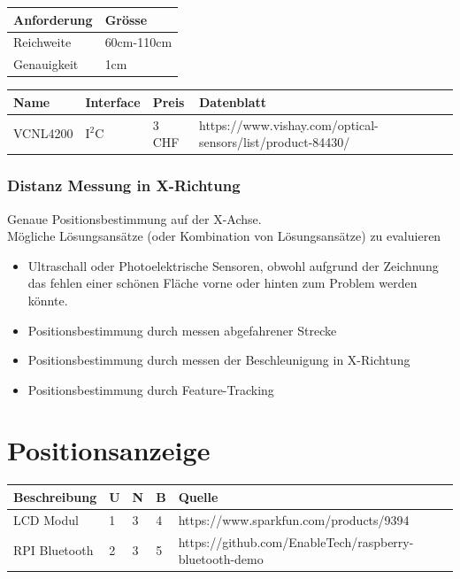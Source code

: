 \documentclass[a4paper]{report}
\begin{document}
\vspace{1em}
\noindent
\begin{tabular}{|p{}|p{}|}
  \hline
  \textbf{Anforderung} & \textbf{Grösse} \\
  \hline
  Reichweite & 60cm-110cm \\
  \hline
  Genauigkeit & 1cm \\
  \hline
\end{tabular}

\vspace{1em}
\noindent
\begin{tabular}{|p{}|p{}|p{}|p{}|}
  \hline
  \textbf{Name} & \textbf{Interface} & \textbf{Preis} & \textbf{Datenblatt} \\
  \hline
  VCNL4200 & $\text{I}^2\text{C}$ & 3 CHF & https://www.vishay.com/optical-sensors/list/product-84430/ \\
  \hline
\end{tabular}

\subsubsection{Distanz Messung in X-Richtung}
\label{app:ssec:DistMessX}
Genaue Positionsbestimmung auf der X-Achse.\\
Mögliche Lösungsansätze (oder Kombination von Lösungsansätze) zu
evaluieren
\begin{itemize}
\item Ultraschall oder Photoelektrische Sensoren, obwohl aufgrund der Zeichnung
  das fehlen einer schönen Fläche vorne oder hinten zum Problem werden könnte.
\item Positionsbestimmung durch messen abgefahrener Strecke
\item Positionsbestimmung durch messen der Beschleunigung in X-Richtung
\item Positionsbestimmung durch Feature-Tracking
\end{itemize}

\section{Positionsanzeige}
\label{app:sec:PosAnz}
\vspace{1em}
\noindent
\begin{tabular}{|p{}|p{}|p{}|p{}|p{}|}
	\hline
	\textbf{Beschreibung} & \textbf{U} & \textbf{N} & \textbf{B} & \textbf{Quelle} \\
	\hline
	LCD Modul & 1 & 3 & 4 & https://www.sparkfun.com/products/9394 \\
	\hline
	RPI Bluetooth & 2 & 3 & 5 & https://github.com/EnableTech/raspberry-bluetooth-demo \\
	\hline
\end{tabular}
\end{document}
